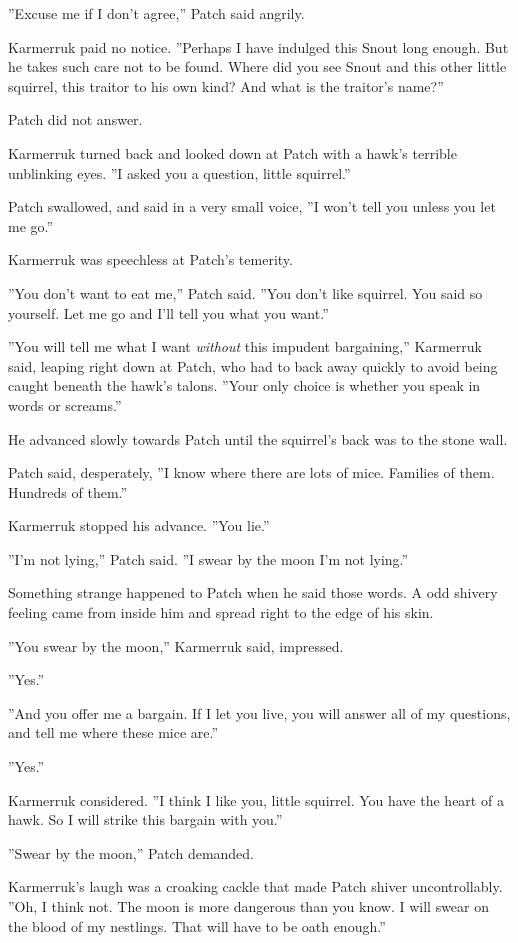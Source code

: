 \documentclass[12pt]{book}
\begin{document}
''Excuse me if I don't agree,'' Patch said angrily.

Karmerruk paid no notice. ''Perhaps I have indulged this Snout long
enough. But he takes such care not to be found. Where did you see
Snout and this other little squirrel, this traitor to his own kind?
And what is the traitor's name?''

Patch did not answer.

Karmerruk turned back and looked down at Patch with a hawk's terrible
unblinking eyes. ''I asked you a question, little squirrel.''

Patch swallowed, and said in a very small voice, ''I won't tell you
unless you let me go.''

Karmerruk was speechless at Patch's temerity.

''You don't want to eat me,'' Patch said. ''You don't like
squirrel. You said so yourself. Let me go and I'll tell you what you
want.''

''You will tell me what I want \textit{without} this impudent
bargaining,'' Karmerruk said, leaping right down at Patch, who had to
back away quickly to avoid being caught beneath the hawk's
talons. ''Your only choice is whether you speak in words or screams.''

He advanced slowly towards Patch until the squirrel's back was to the
stone wall.

Patch said, desperately, ''I know where there are lots of
mice. Families of them. Hundreds of them.''

Karmerruk stopped his advance. ''You lie.''

''I'm not lying,'' Patch said. ''I swear by the moon I'm not lying.''

Something strange happened to Patch when he said those words. A odd
shivery feeling came from inside him and spread right to the edge of
his skin.

''You swear by the moon,'' Karmerruk said, impressed.

''Yes.''

''And you offer me a bargain. If I let you live, you will answer all
of my questions, and tell me where these mice are.''

''Yes.''

Karmerruk considered. ''I think I like you, little squirrel. You have
the heart of a hawk. So I will strike this bargain with you.''

''Swear by the moon,'' Patch demanded.

Karmerruk's laugh was a croaking cackle that made Patch shiver
uncontrollably. ''Oh, I think not. The moon is more dangerous than you
know. I will swear on the blood of my nestlings. That will have to be
oath enough.''
\end{document}
